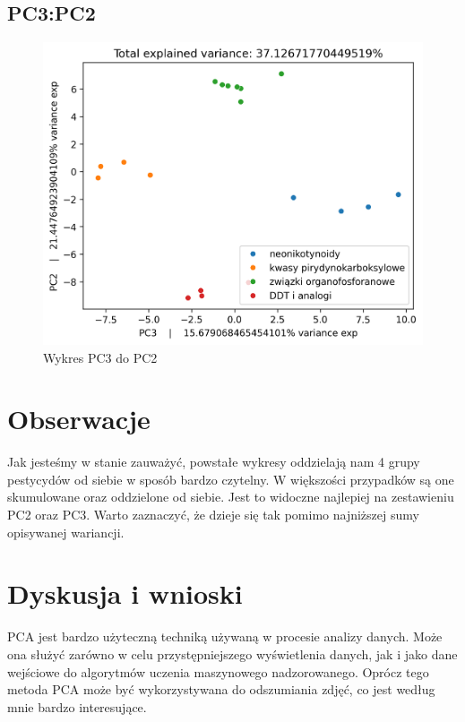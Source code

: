 \documentclass[12pt, a4paper]{article}
\begin{document}
    \subsection*{PC3:PC2}
        \begin{figure}[H]
            \centering
            \includegraphics{32.png}
            \caption{Wykres PC3 do PC2}
        \end{figure}

\section{Obserwacje}
    
    Jak jesteśmy w stanie zauważyć, powstałe wykresy oddzielają nam 4 grupy pestycydów od siebie
    w sposób bardzo czytelny. W większości przypadków są one skumulowane oraz oddzielone od siebie. Jest to
    widoczne najlepiej na zestawieniu PC2 oraz PC3. Warto zaznaczyć, że dzieje się tak pomimo najniższej sumy opisywanej wariancji.

\section{Dyskusja i wnioski}

    PCA jest bardzo użyteczną techniką używaną w procesie analizy danych. Może ona służyć zarówno w celu przystępniejszego
    wyświetlenia danych, jak i jako dane wejściowe do algorytmów uczenia maszynowego nadzorowanego. Oprócz tego metoda
    PCA może być wykorzystywana do odszumiania zdjęć, co jest według mnie bardzo interesujące. 
\end{document}
